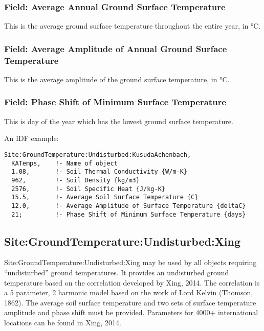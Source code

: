 \subsubsection{Field: Average Annual Ground Surface Temperature}\label{field-average-annual-ground-surface-temperature}

This is the average ground surface temperature throughout the entire year, in °C.

\subsubsection{Field: Average Amplitude of Annual Ground Surface Temperature}\label{field-average-amplitude-of-annual-ground-surface-temperature}

This is the average amplitude of the ground surface temperature, in °C.

\subsubsection{Field: Phase Shift of Minimum Surface Temperature}\label{field-phase-shift-of-minimum-surface-temperature}

This is day of the year which has the lowest ground surface temperature.

An IDF example:

\begin{lstlisting}
Site:GroundTemperature:Undisturbed:KusudaAchenbach,
  KATemps,    !- Name of object
  1.08,       !- Soil Thermal Conductivity {W/m-K}
  962,        !- Soil Density {kg/m3}
  2576,       !- Soil Specific Heat {J/kg-K}
  15.5,       !- Average Soil Surface Temperature {C}
  12.0,       !- Average Amplitude of Surface Temperature {deltaC}
  21;         !- Phase Shift of Minimum Surface Temperature {days}
\end{lstlisting}

\subsection{Site:GroundTemperature:Undisturbed:Xing}\label{sitegroundtemperatureundisturbedxing}

Site:GroundTemperature:Undisturbed:Xing may be used by all objects requiring ``undisturbed'' ground temperatures. It provides an undisturbed ground temperature based on the correlation developed by Xing, 2014. The correlation is a 5 parameter, 2 harmonic model based on the work of Lord Kelvin (Thomson, 1862). The average soil surface temperature and two sets of surface temperature amplitude and phase shift must be provided. Parameters for 4000+ international locations can be found in Xing, 2014.

